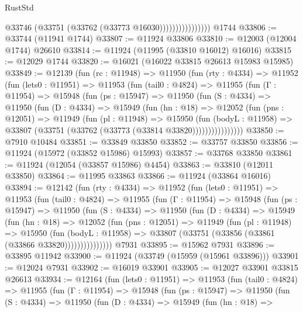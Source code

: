 \begin{lexlean}{RustStd}
\begin{coremodule}
                            @33746 (@33751 (@33762 (@33773 @16030))))))))))))))))
    @1744
@33806 := @33744 (@11941 @1744)
@33807 := @11924 @33806
@33810 := @12003 (@12004 @1744) @26610
@33814 := @11924 (@11995 (@33810 @16012) @16016)
@33815 := @12029 @1744
@33820 := @16021 (@16022 @33815 @26613 @15983 @15985)
@33849 := @12139
    (fun (rc : @11948) =>
    @11950
      (fun (rty : @4334) =>
      @11952
        (fun (lets0 : @11951) =>
        @11953
          (fun (tail0 : @4824) =>
          @11955
            (fun (Γ : @11954) =>
            @15948
              (fun (ps : @15947) =>
              @11950
                (fun (S : @4334) =>
                @11950
                  (fun (D : @4334) =>
                  @15949
                    (fun (hn : @18) =>
                    @12052
                      (fun (pns : @12051) =>
                      @11949
                        (fun (pl : @11948) =>
                        @15950
                          (fun (bodyL : @11958) =>
                          @33807 (@33751 (@33762 (@33773 (@33814 @33820))))))))))))))))
@33850 := @7910 @10484
@33851 := @33849 @33850
@33852 := @33757 @33850
@33856 := @11924 (@15972 (@33852 @15986) @15993)
@33857 := @33768 @33850
@33861 := @11924 (@12054 (@33857 @15986) @4454)
@33863 := @33810 (@12011 @33850)
@33864 := @11995 @33863
@33866 := @11924 (@33864 @16016)
@33894 := @12142
    (fun (rty : @4334) =>
    @11952
      (fun (lets0 : @11951) =>
      @11953
        (fun (tail0 : @4824) =>
        @11955
          (fun (Γ : @11954) =>
          @15948
            (fun (ps : @15947) =>
            @11950
              (fun (S : @4334) =>
              @11950
                (fun (D : @4334) =>
                @15949
                  (fun (hn : @18) =>
                  @12052
                    (fun (pns : @12051) =>
                    @11949
                      (fun (pl : @11948) =>
                      @15950
                        (fun (bodyL : @11958) =>
                        @33807 (@33751 (@33856 (@33861 (@33866 @33820)))))))))))))))
    @7931
@33895 := @15962 @7931
@33896 := @33895 @11942
@33900 := @11924 (@33749 (@15959 (@15961 @33896)))
@33901 := @12024 @7931
@33902 := @16019 @33901
@33905 := @12027 @33901 @33815 @26613
@33934 := @12164
    (fun (lets0 : @11951) =>
    @11953
      (fun (tail0 : @4824) =>
      @11955
        (fun (Γ : @11954) =>
        @15948
          (fun (ps : @15947) =>
          @11950
            (fun (S : @4334) =>
            @11950
              (fun (D : @4334) =>
              @15949
                (fun (hn : @18) =>

\end{coremodule}
\end{lexlean}
